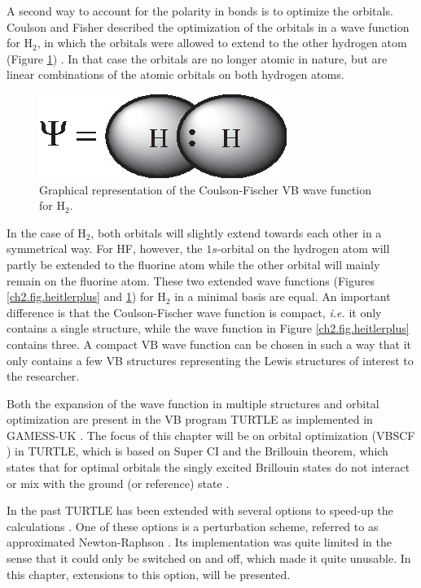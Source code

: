 A second way to account for the polarity in bonds is to optimize the orbitals. Coulson and Fisher described the optimization of the orbitals in a wave function for H$_2$, in which the orbitals were allowed to extend to the other hydrogen atom (Figure \ref{ch2.fig.coulson}) \cite{coulson}. In that case the orbitals are no longer atomic in nature, but are linear combinations of the atomic orbitals on both hydrogen atoms.
\begin{figure}[ht]
\center
\includegraphics{orbopt/figures/coulson.eps}
\caption{Graphical representation of the Coulson-Fischer VB wave function for H$_2$.}
\label{ch2.fig.coulson}
\end{figure}
In the case of H$_2$, both orbitals will slightly extend towards each other in a symmetrical way. For HF, however, the $1s$-orbital on the hydrogen atom will partly be extended to the fluorine atom while the other orbital will mainly remain on the fluorine atom. These two extended wave functions (Figures \ref{ch2.fig.heitlerplus} and \ref{ch2.fig.coulson}) for H$_2$ in a minimal basis are equal. An important difference is that the Coulson-Fischer wave function is compact, \textit{i.e.} it only contains a single structure, while the wave function in Figure \ref{ch2.fig.heitlerplus} contains three. A compact VB wave function can be chosen in such a way that it only contains a few VB structures representing the Lewis structures of interest to the researcher. 

Both the expansion of the wave function in multiple structures and orbital optimization are present in the VB program TURTLE \cite{turtle} as implemented in GAMESS-UK \cite{gamess}. The focus of this chapter will be on orbital optimization (VBSCF \cite{vbscf1,vbscf2}) in TURTLE, which is based on Super CI \cite{superci1,superci2} and the Brillouin theorem, which states that for optimal orbitals the singly excited Brillouin states do not interact or mix with the ground (or reference) state \cite{brillouin}.

In the past TURTLE has been extended with several options to speed-up the calculations \cite{diis1,diis2,level1,level2}. One of these options is a perturbation scheme, referred to as approximated Newton-Raphson \cite{koos1}. Its implementation was quite limited in the sense that it could only be switched on and off, which made it quite unusable. In this chapter, extensions to this option, will be presented.

